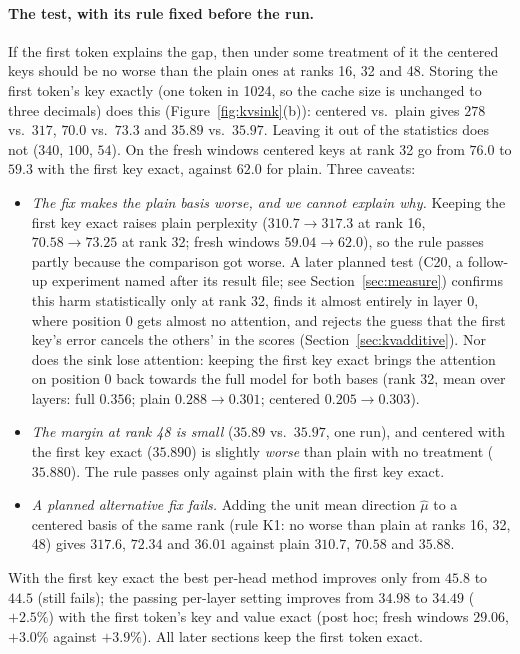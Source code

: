 \documentclass[10pt]{article}
\theoremstyle{plain}
\theoremstyle{definition}
\theoremstyle{remark}
\newcommand{\rl}[1]{\textsf{#1}}%
\begin{document}
\paragraph{The test, with its rule fixed before the run.}
If the first token explains the gap, then under some treatment of it the centered keys should be no worse than the plain ones at ranks 16, 32 and 48. Storing the first token's key exactly (one token in 1024, so the cache size is unchanged to three decimals) does this (Figure~\ref{fig:kvsink}(b)): centered vs.\ plain gives $278$ vs.\ $317$, $70.0$ vs.\ $73.3$ and $35.89$ vs.\ $35.97$. Leaving it out of the statistics does not ($340$, $100$, $54$). On the fresh windows centered keys at rank 32 go from $76.0$ to $59.3$ with the first key exact, against $62.0$ for plain. Three caveats:
\begin{itemize}[leftmargin=2em,itemsep=1pt]
\item \emph{The fix makes the plain basis worse, and we cannot explain why.} Keeping the first key exact raises plain perplexity ($310.7\to317.3$ at rank 16, $70.58\to73.25$ at rank 32; fresh windows $59.04\to62.0$), so the rule passes partly because the comparison got worse. A later planned test (C20, a follow-up experiment named after its result file; see Section~\ref{sec:measure}) confirms this harm statistically only at rank 32, finds it almost entirely in layer 0, where position 0 gets almost no attention, and rejects the guess that the first key's error cancels the others' in the scores (Section~\ref{sec:kvadditive}). Nor does the sink lose attention: keeping the first key exact brings the attention on position 0 back towards the full model for both bases (rank 32, mean over layers: full $0.356$; plain $0.288\to0.301$; centered $0.205\to0.303$).
\item \emph{The margin at rank 48 is small} ($35.89$ vs.\ $35.97$, one run), and centered with the first key exact ($35.890$) is slightly \emph{worse} than plain with no treatment ($35.880$). The rule passes only against plain with the first key exact.
\item \emph{A planned alternative fix fails.} Adding the unit mean direction $\hat\mu$ to a centered basis of the same rank (rule \rl{K1}: no worse than plain at ranks 16, 32, 48) gives $317.6$, $72.34$ and $36.01$ against plain $310.7$, $70.58$ and $35.88$.
\end{itemize}
With the first key exact the best per-head method improves only from $45.8$ to $44.5$ (still fails); the passing per-layer setting improves from $34.98$ to $34.49$ ($+2.5\%$) with the first token's key and value exact (post hoc; fresh windows $29.06$, $+3.0\%$ against $+3.9\%$). All later sections keep the first token exact.
\end{document}
